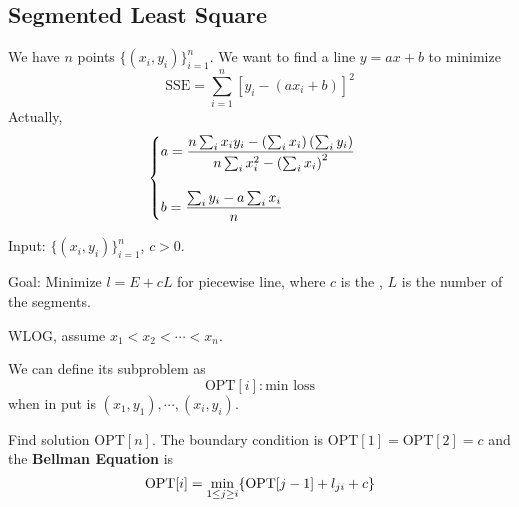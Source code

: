 \subsection{Segmented Least Square}

\begin{example}
    We have  $ n  $ points  $ \{(x_i,y_i)\}_{i=1}^n $. We want to find a line  $ y=ax+b $ to minimize 
    \begin{equation}
        \mathrm{SSE}=\sum_{i=1}^n[y_i-(ax_i+b)]^2
    \end{equation}  
    Actually, \[ \begin{cases}
        a=\displaystyle\frac{n\sum_ix_iy_i-\left(\sum_ix_i\right)\left(\sum_iy_i\right)}{n\sum_ix_i^2-\left(\sum_ix_i\right)^2}\\
        \\
        b=\displaystyle\frac{\sum_iy_i-a \sum_ix_i}{n}
    \end{cases} \]
\end{example}

\begin{example}
    Input:  $ \{(x_i,y_i)\}_{i=1}^n $,  $ c>0 $.
    
    Goal: Minimize  $ l=E+cL $ for piecewise line, where  $ c $ is the ,  $ L  $ is the number of the segments.
\end{example}

WLOG, assume  $ x_1<x_2<\cdots<x_n $. 

We can define its subproblem as 
\[\mathrm{OPT}[i]:\text{min loss}\]
when in put is  $ (x_1,y_1),\cdots,(x_i,y_i) $.

Find solution  $ \mathrm{OPT}[n] $. The boundary condition is  $ \mathrm{OPT}[1]=\mathrm{OPT}[2]=c $ and the \textbf{Bellman Equation} is 
\[\mathrm{OPT}[i]=\min_{1 \leq j \geq i}\{\mathrm{OPT}[j-1]+l_{ji}+c\}\] 

